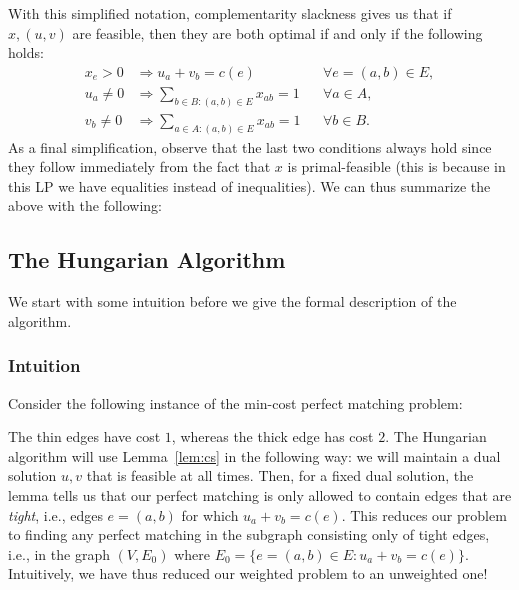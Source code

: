 With this simplified notation, complementarity slackness gives us that if $x,(u,v)$ are feasible,
then they are both optimal if and only if the following holds:
\begin{align*}
  x_e>0 &\Rightarrow u_a+v_b=c(e) && \forall e=(a,b)\in E,\\
  u_a\neq 0 &\Rightarrow \sum_{b\in B:(a,b)\in E}x_{ab}=1 && \forall a\in A,\\
  v_b\neq 0 &\Rightarrow \sum_{a\in A:(a,b)\in E}x_{ab}=1 && \forall b\in B.
\end{align*}
As a final simplification, observe that the last two conditions always hold since they follow
immediately from the fact that $x$ is primal-feasible (this is because in this LP we have
equalities instead of inequalities). We can thus summarize the above with the following:
\label{lem:cs}

\subsection{The Hungarian Algorithm}

We start with some intuition before we give the formal description of the algorithm.

\subsubsection*{Intuition}

Consider the following instance of the min-cost perfect matching problem:

\begin{center}
\end{center}

The thin edges have cost $1$, whereas the thick edge has cost $2$. The Hungarian algorithm will
use Lemma~\ref{lem:cs} in the following way: we will maintain a dual solution $u,v$ that is
feasible at all times. Then, for a fixed dual solution, the lemma tells us that our perfect
matching is only allowed to contain edges that are \emph{tight}, i.e., edges $e=(a,b)$ for which
$u_a+v_b=c(e)$. This reduces our problem to finding any perfect matching in the subgraph
consisting only of tight edges, i.e., in the graph $(V,E_0)$ where
$E_0=\{e=(a,b)\in E: u_a+v_b=c(e)\}$. Intuitively, we have thus reduced our weighted problem to
an unweighted one!

